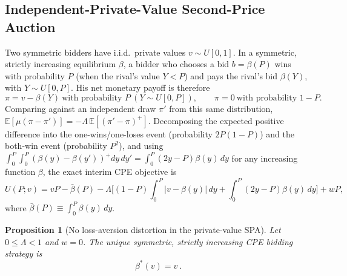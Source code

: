 \documentclass[11pt,a4paper]{article}
\newtheorem{proposition}{Proposition}
\theoremstyle{remark}
\begin{document}
\subsection{Independent-Private-Value Second-Price Auction}
\label{sec:ipvspa}
Two symmetric bidders have i.i.d.\ private values $v\sim U[0,1]$. In a symmetric,
strictly increasing equilibrium $\beta$, a bidder who chooses a bid $b=\beta(P)$ wins
with probability $P$ (when the rival's value $Y<P$) and pays the rival's bid
$\beta(Y)$, with $Y\sim U[0,P]$. His net monetary payoff is therefore
\begin{equation}
\pi=v-\beta(Y)\ \text{with probability }P\ (Y\sim U[0,P]),
\qquad \pi=0\ \text{with probability }1-P.
\end{equation}
Comparing against an independent draw $\pi'$ from this same distribution,
$\mathbb{E}[\mu(\pi-\pi')]=-\Lambda\,\mathbb{E}[(\pi'-\pi)^+]$. Decomposing the
expected positive difference into the one-wins/one-loses event (probability
$2P(1-P)$) and the both-win event (probability $P^2$), and using
$\int_0^P\int_0^P(\beta(y)-\beta(y'))^{+}dy\,dy'=\int_0^P(2y-P)\beta(y)\,dy$ for any
increasing function $\beta$, the exact interim CPE objective is
\begin{equation}
U(P;v)=vP-\bar\beta(P)
-\Lambda\Big[(1-P)\!\int_0^P\!|v-\beta(y)|\,dy+\int_0^P(2y-P)\beta(y)\,dy\Big]+wP,
\label{eq:spaobj}
\end{equation}
where $\bar\beta(P)\equiv\int_0^P\beta(y)\,dy$.

\begin{proposition}[No loss-aversion distortion in the private-value SPA]
\label{prop:spa0}
Let $0\le\Lambda<1$ and $w=0$. The unique symmetric, strictly increasing CPE bidding
strategy is
\begin{equation}
\boxed{\ \beta^{*}(v)=v\ }.
\end{equation}
\end{proposition}
\end{document}

